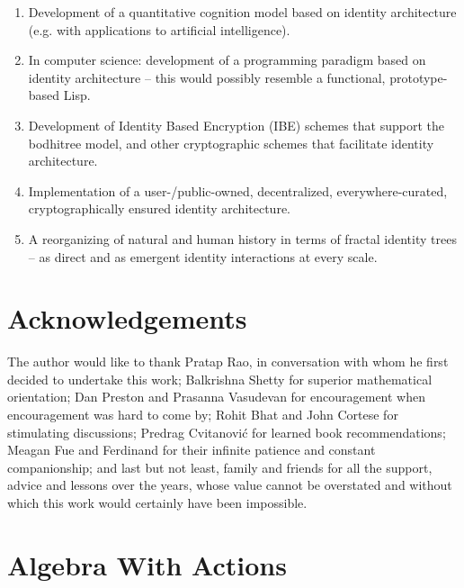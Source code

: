 \documentclass[pra,twocolumn,groupedaddress,10pt]{revtex4}
\theoremstyle{definition}
\begin{document}
\begin{enumerate}
	\item Development of a quantitative cognition model based on identity architecture (e.g. with applications to artificial intelligence).
	\item In computer science: development of a programming paradigm based on identity architecture -- this would possibly resemble a functional, prototype-based Lisp.
	\item Development of Identity Based Encryption (IBE) schemes that support the bodhitree model, and other cryptographic schemes that facilitate identity architecture.
	\item Implementation of a user-/public-owned, decentralized, everywhere-curated, cryptographically ensured identity architecture.
	\item A reorganizing of natural and human history in terms of fractal identity trees -- as direct and as emergent identity interactions at every scale.
\end{enumerate}

\section{Acknowledgements} \label{sec:acknowledgements}

The author would like to thank Pratap Rao, in conversation with whom he first decided to undertake this work; Balkrishna Shetty for superior mathematical orientation; Dan Preston and Prasanna Vasudevan for encouragement when encouragement was hard to come by; Rohit Bhat and John Cortese for stimulating discussions; Predrag Cvitanovi\'{c} for learned book recommendations; Meagan Fue and Ferdinand for their infinite patience and constant companionship; and last but not least, family and friends for all the support, advice and lessons over the years, whose value cannot be overstated and without which this work would certainly have been impossible.




\appendix

\section{Algebra With Actions} \label{app:algact}
\end{document}

